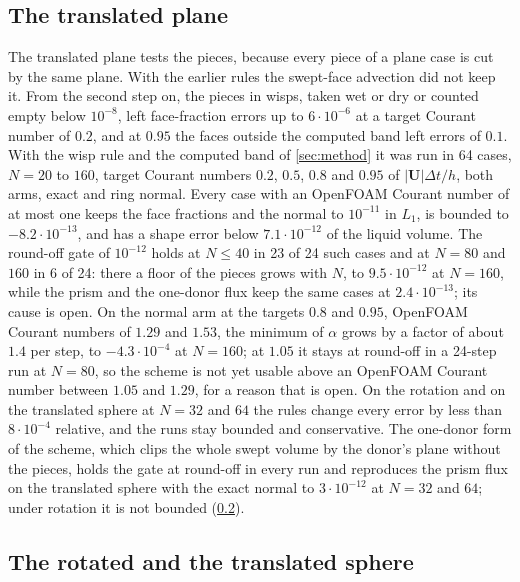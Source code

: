 \documentclass[preprint,12pt]{elsarticle}
\begin{document}
\subsection{The translated plane}
\label{sec:planegate}

The translated plane tests the pieces, because every piece of a plane case is cut by the same plane. With the earlier rules the swept-face advection did not keep it. From the second step on, the pieces in wisps, taken wet or dry or counted empty below $10^{-8}$, left face-fraction errors up to $6\cdot10^{-6}$ at a target Courant number of $0.2$, and at $0.95$ the faces outside the computed band left errors of $0.1$. With the wisp rule and the computed band of \cref{sec:method} it was run in 64 cases, $N = 20$ to $160$, target Courant numbers $0.2$, $0.5$, $0.8$ and $0.95$ of $|\mathbf{U}|\Delta t/h$, both arms, exact and ring normal. Every case with an OpenFOAM Courant number of at most one keeps the face fractions and the normal to $10^{-11}$ in $L_1$, is bounded to $-8.2\cdot10^{-13}$, and has a shape error below $7.1\cdot10^{-12}$ of the liquid volume. The round-off gate of $10^{-12}$ holds at $N \le 40$ in 23 of 24 such cases and at $N = 80$ and $160$ in 6 of 24: there a floor of the pieces grows with $N$, to $9.5\cdot10^{-12}$ at $N = 160$, while the prism and the one-donor flux keep the same cases at $2.4\cdot10^{-13}$; its cause is open. On the normal arm at the targets $0.8$ and $0.95$, OpenFOAM Courant numbers of $1.29$ and $1.53$, the minimum of $\alpha$ grows by a factor of about $1.4$ per step, to $-4.3\cdot10^{-4}$ at $N = 160$; at $1.05$ it stays at round-off in a 24-step run at $N = 80$, so the scheme is not yet usable above an OpenFOAM Courant number between $1.05$ and $1.29$, for a reason that is open. On the rotation and on the translated sphere at $N = 32$ and $64$ the rules change every error by less than $8\cdot10^{-4}$ relative, and the runs stay bounded and conservative. The one-donor form of the scheme, which clips the whole swept volume by the donor's plane without the pieces, holds the gate at round-off in every run and reproduces the prism flux on the translated sphere with the exact normal to $3\cdot10^{-12}$ at $N = 32$ and $64$; under rotation it is not bounded (\cref{sec:ladders}).

\subsection{The rotated and the translated sphere}
\label{sec:ladders}
\end{document}
